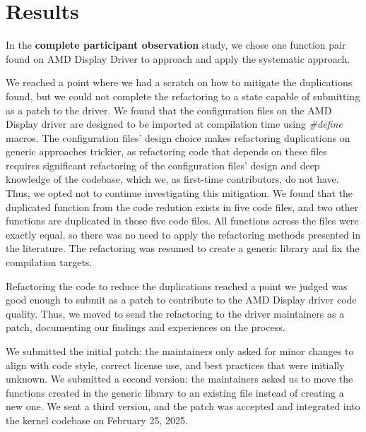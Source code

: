\documentclass[10pt,conference]{IEEEtran}
\begin{document}
\section{Results}

In the \textbf{complete participant observation} study, we chose one function pair found on AMD Display Driver to approach and apply the systematic approach.

We reached a point where we had a scratch on how to mitigate the duplications found, but we could not complete the refactoring to a state capable of submitting as a patch to the driver. We found that the configuration files on the AMD Display driver are designed to be imported at compilation time using \textit{\#define} macros. The configuration files' design choice makes refactoring duplications on generic approaches trickier, as refactoring code that depends on these files requires significant refactoring of the configuration files' design and deep knowledge of the codebase, which we, as first-time contributors, do not have. Thus, we opted not to continue investigating this mitigation.
We found that the duplicated function from the code redution exists in five code files, 
and two other functions are duplicated in those five code files. All functions across the files were exactly equal, 
so there was no need to apply the refactoring methods presented in the literature. 
The refactoring was resumed to create a generic library and fix the compilation targets.

Refactoring the code to reduce the duplications reached a point we judged was good enough to submit as a 
patch to contribute to the AMD Display driver code quality. Thus, we moved to send 
the refactoring to the driver maintainers as a patch, documenting our findings and experiences 
on the process.

We submitted the initial patch: the maintainers only asked for minor changes to align with code style, correct license use, and best practices that were initially unknown. We submitted a second version: the maintainers asked us to move the functions created in the generic library to an existing file instead of creating a new one. We sent a third version, and the patch was accepted and integrated into the kernel codebase on February 25, 2025.
\end{document}

